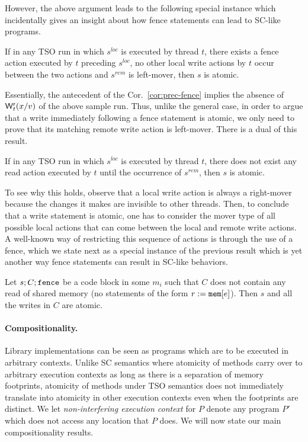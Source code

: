 However, the above argument leads to the following special instance which incidentally gives an insight about how fence statements can lead to SC-like programs.
\begin{corollary}\label{cor:prec-fence}
If in any TSO run in which $s^{loc}$ is executed by thread $t$, there exists a fence action executed by $t$ preceding $s^{loc}$, no other local write actions by $t$ occur between the two actions and $s^{rem}$ is left-mover, then $s$ is atomic.
\end{corollary}
Essentially, the antecedent of the Cor.~\ref{cor:prec-fence} implies the absence of $\mathsf{W}^{\mathsf{r}}_{t}(x/v)$ of the above sample run.
Thus, unlike the general case, in order to argue that a write immediately following a fence statement is atomic, we only need to prove that its matching remote write action is left-mover. 
There is a dual of this result.
\begin{lemma}
If in any TSO run in which $s^{loc}$ is executed by thread $t$, there does not exist any read action executed by $t$ until the occurrence of $s^{rem}$, then $s$ is atomic.
\end{lemma}
To see why this holds, observe that a local write action is always a right-mover because the changes it makes are invisible to other threads.
Then, to conclude that a write statement is atomic, one has to consider the mover type of all possible local actions that can come between the local and remote write actions.
A well-known way of restricting this sequence of actions is through the use of a fence, which we state next as a special instance of the previous result which is yet another way fence statements can result in  SC-like behaviors.
\begin{corollary}\label{cor:succ-fence}
Let $s;C;\mathtt{fence}$ be a code block in some $m_i$ such that $C$ does not contain any read of shared memory (no statements of the form $r:=\mathtt{mem}[e]$).
Then $s$ and all the writes in $C$ are atomic.
\end{corollary}

\paragraph{Compositionality.}
Library implementations can be seen as programs which are to be executed in arbitrary contexts.
Unlike SC semantics where atomicity of methods carry over to arbitrary execution contexts as long as there is a separation of memory footprints, atomicity of methods under TSO semantics does not immediately translate into atomicity in other execution contexts even when the footprints are distinct.
We let {\em non-interfering execution context} for $P$ denote any program $P'$ which does not access any location that $P$ does.
We will now state our main compositionality results.


